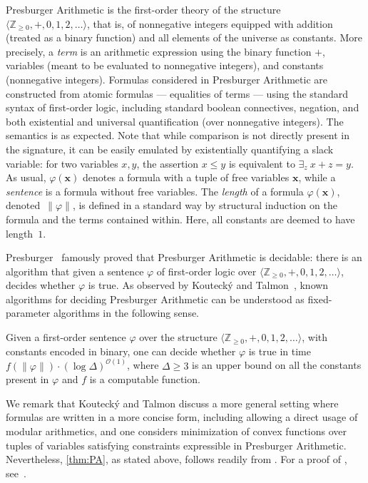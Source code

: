 \documentclass{theoretics}
\renewcommand{\leq}{\leqslant}
\renewcommand{\geq}{\geqslant}
\newcommand{\Z}{\mathbb{Z}}
\newcommand{\Zn}{\Z_{\geq 0}}
\newcommand{\tup}[1]{{\mathbf{#1}}}
\newcommand{\xx}{\tup x}
\newcommand{\Oh}{{\mathcal{O}}}
\begin{document}
Presburger Arithmetic is the first-order theory of the structure $\langle \Zn,+,0,1,2,\ldots \rangle$, that is, of nonnegative integers equipped with addition (treated as a binary function) and all elements of the universe as constants. More precisely, a {\em{term}} is an arithmetic expression using the binary function $+$, variables (meant to be evaluated to nonnegative integers), and constants (nonnegative integers). Formulas considered in Presburger Arithmetic are constructed from atomic formulas --- equalities of terms --- using the standard syntax of first-order logic, including standard boolean connectives, negation, and both existential and universal quantification (over nonnegative integers). The semantics is as expected. Note that while comparison is not directly present in the signature, it can be easily emulated by existentially quantifying a slack variable: for two variables $x,y$, the assertion $x\leq y$ is equivalent to $\exists_z\ x+z=y$. As usual, $\varphi(\xx)$ denotes a formula with a tuple of free variables $\xx$, while a {\em{sentence}} is a formula without free variables. The {\em{length}} of a formula $\varphi(\xx)$, denoted~$\|\varphi\|$, is defined in a standard way by structural induction on the formula and the terms contained within. Here, all constants are deemed to have length~$1$.

Presburger~\cite{Presburger29} famously proved that Presburger Arithmetic is decidable: there is an algorithm that given a sentence $\varphi$ of first-order logic over $\langle \Zn,+,0,1,2,\ldots \rangle$, decides whether $\varphi$ is true. As observed by Kouteck\'y and Talmon~\cite{KouteckyT21}, known algorithms for deciding Presburger Arithmetic can be understood as fixed-parameter algorithms in the following sense.

\begin{theorem}\label{thm:PA}
Given a first-order sentence $\varphi$ over the structure $\langle \Zn,+,0,1,2,\ldots \rangle$, with constants encoded in binary, one can decide whether $\varphi$ is true in time $f(\|\varphi\|)\cdot (\log \Delta)^{\Oh(1)}$, where $\Delta\geq 3$ is an upper bound on all the constants present in $\varphi$ and $f$ is a computable function.
\end{theorem}

We remark that Kouteck\'y and Talmon discuss a more general setting where formulas are written in a more concise form, including allowing a direct usage of modular arithmetics, and one considers minimization of convex functions over tuples of variables satisfying constraints expressible in Presburger Arithmetic. Nevertheless, \cref{thm:PA}, as stated above, follows readily from \cite[Theorem~1]{KouteckyT21}. For a proof of \cite[Theorem~1]{KouteckyT21}, see~\cite[Theorem~2.2]{KouteckyT20}.
\end{document}
